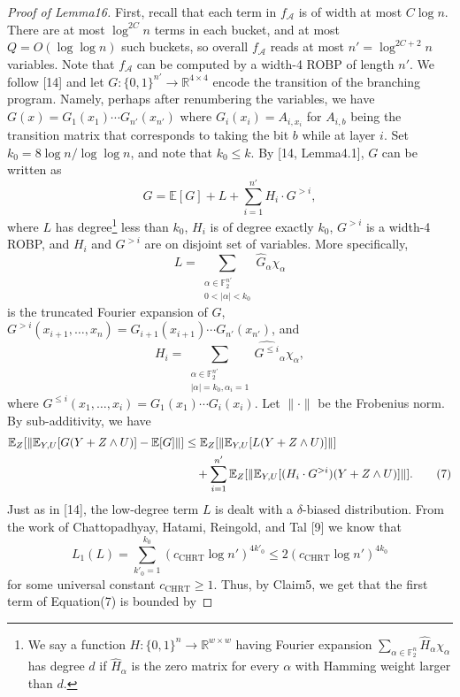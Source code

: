 \begin{proof}[Proof of Lemma16]
First, recall that each term in $f_{\mathcal A}$ is of width at most $C\log n$. There are at most $\log^{2C}n$ terms in each bucket, and at most $Q=O(\log\log n)$ such buckets, so overall $f_{\mathcal A}$ reads at most $n'=\log^{2C+2}n$ variables.
Note that $f_{\mathcal A}$ can be computed by a width-4 ROBP of length $n'$. We follow [14] and let $G:\{0,1\}^{n'}\to\mathbb R^{4\times4}$ encode the transition of the branching program. Namely, perhaps after renumbering the variables, we have $G(x)=G_1(x_1)\cdots G_{n'}(x_{n'})$ where $G_i(x_i)=A_{i,x_i}$ for $A_{i,b}$ being the transition matrix that corresponds to taking the bit $b$ while at layer $i$. Set $k_0=8\log n/\log\log n$, and note that $k_0\le k$. By [14, Lemma4.1], $G$ can be written as
\[
G=\mathbb E[G]+L+\sum_{i=1}^{n'}H_i\cdot G^{>i},
\]
where $L$ has degree\footnote{We say a function $H:\{0,1\}^n\to\mathbb R^{w\times w}$ having Fourier expansion $\sum_{\alpha\in\mathbb F_2^n}\widehat H_\alpha\chi_\alpha$ has degree $d$ if $\widehat H_\alpha$ is the zero matrix for every $\alpha$ with Hamming weight larger than $d$.} less than $k_0$, $H_i$ is of degree exactly $k_0$, $G^{>i}$ is a width-4 ROBP, and $H_i$ and $G^{>i}$ are on disjoint set of variables. More specifically,
\[
L=\sum_{\substack{\alpha\in\mathbb F_2^{n'}\\0<|\alpha|<k_0}}\widehat G_\alpha\chi_\alpha
\]
is the truncated Fourier expansion of $G$, $G^{>i}(x_{i+1},\ldots,x_n)=G_{i+1}(x_{i+1})\cdots G_{n'}(x_{n'})$, and
\[
H_i=\sum_{\substack{\alpha\in\mathbb F_2^{n'}\\|\alpha|=k_0,\alpha_i=1}}\widehat{G^{\le i}}_\alpha\chi_\alpha,
\]
where $G^{\le i}(x_1,\ldots,x_i)=G_1(x_1)\cdots G_i(x_i)$. Let $\|\cdot\|$ be the Frobenius norm. By sub-additivity, we have
\begin{align}
\mathbb E_Z[\|\mathbb E_{Y,U}[G(Y+Z\wedge U)]-\mathbb E[G]\|]
&\le\mathbb E_Z[\|\mathbb E_{Y,U}[L(Y+Z\wedge U)]\|]\notag\\
&\quad+\sum_{i=1}^{n'}\mathbb E_Z[\|\mathbb E_{Y,U}[(H_i\cdot G^{>i})(Y+Z\wedge U)]\|].\tag{7}
\end{align}
Just as in [14], the low-degree term $L$ is dealt with a $\delta$-biased distribution. From the work of Chattopadhyay, Hatami, Reingold, and Tal [9] we know that
\[
L_1(L)=\sum_{k'_0=1}^{k_0}(c_{\mathrm{CHRT}}\log n')^{4k'_0}\le2(c_{\mathrm{CHRT}}\log n')^{4k_0}
\]
for some universal constant $c_{\mathrm{CHRT}}\ge1$. Thus, by Claim5, we get that the first term of Equation(7) is bounded by

\end{proof}
